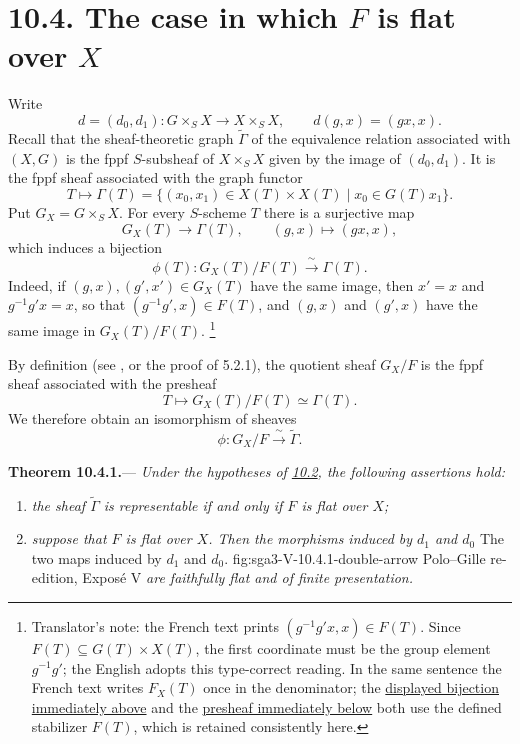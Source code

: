 \section*{10.4. The case in which \(F\) is flat over \(X\)}
\label{sec:sga3-V-10.4}

Write
\[
  d=(d_0,d_1):G\times_SX\longrightarrow X\times_SX,
  \qquad d(g,x)=(gx,x).
\]
Recall that the sheaf-theoretic graph \(\widetilde\Gamma\) of the
equivalence relation associated with \((X,G)\) is the fppf
\(S\)-subsheaf of \(X\times_SX\) given by the image of
\((d_0,d_1)\). It is the fppf sheaf associated with the graph functor
\[
  T\longmapsto
  \Gamma(T)=\bigl\{(x_0,x_1)\in X(T)\times X(T)
  \mathrel{|} x_0\in G(T)x_1\bigr\}.
\]
Put \(G_X=G\times_SX\). For every \(S\)-scheme \(T\) there is a
surjective map
\[
  G_X(T)\longrightarrow\Gamma(T),
  \qquad (g,x)\longmapsto(gx,x),
\]
which induces a bijection%
\label{eq:sga3-V-10.4-phiT-bijection}%
\[
  \phi(T):G_X(T)/F(T)\xrightarrow{\ \sim\ }\Gamma(T).
\]
Indeed, if \((g,x),(g',x')\in G_X(T)\) have the same image, then
\(x'=x\) and \(g^{-1}g'x=x\), so that
\((g^{-1}g',x)\in F(T)\), and \((g,x)\) and \((g',x)\) have the same
image in \(G_X(T)/F(T)\).%
\footnote{\label{source-note:sga3-V-10.4-ft-typing}Translator's note: the French text prints \((g^{-1}g'x,x)\in F(T)\). Since
\(F(T)\subseteq G(T)\times X(T)\), the first coordinate must be the
group element \(g^{-1}g'\); the English adopts this type-correct
reading. In the same sentence the French text writes \(F_X(T)\) once in
the denominator; the \hyperref[eq:sga3-V-10.4-phiT-bijection]{displayed bijection immediately above} and the
\hyperref[eq:sga3-V-10.4-quotient-presheaf]{presheaf immediately below} both use the defined stabilizer \(F(T)\),
which is retained consistently here.}

By definition (see , or the proof of 5.2.1),
the quotient sheaf \(G_X/F\) is the fppf sheaf associated with the
presheaf%
\label{eq:sga3-V-10.4-quotient-presheaf}%
\[
  T\longmapsto G_X(T)/F(T)\simeq\Gamma(T).
\]
We therefore obtain an isomorphism of sheaves
\[
  \phi:G_X/F\xrightarrow{\ \sim\ }\widetilde\Gamma.
\]

\medskip
{}\label{thm:sga3-V-10.4.1}%
\noindent\textbf{Theorem 10.4.1.}---%
\textit{Under the hypotheses of \hyperref[sec:sga3-V-10.2]{10.2},
the following assertions hold:}
\begin{enumerate}
\item[\textit{a)}]\label{thm:sga3-V-10.4.1-a}%
  \textit{the sheaf \(\widetilde\Gamma\) is representable if and only
  if \(F\) is flat over \(X\);}
\item[\textit{b)}]\label{thm:sga3-V-10.4.1-b}%
  \textit{suppose that \(F\) is flat over \(X\). Then the morphisms
  induced by \(d_1\) and \(d_0\)}
    {The two maps induced by \(d_1\) and \(d_0\).}
    {fig:sga3-V-10.4.1-double-arrow}
    {Polo--Gille re-edition, Expos\'e V}
  \textit{are faithfully flat and of finite presentation.}
\end{enumerate}

